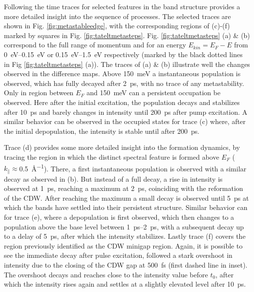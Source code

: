Following the time traces for selected features in the band structure provides a more detailed insight into the sequence of processes.
The selected traces are shown in Fig. \ref{fig:metastableedge}, with the corresponding regions of (c)-(f) marked by squares in Fig. \ref{fig:tateltmetasteps}.
Fig. \ref{fig:tateltmetasteps} (a) \& (b) correspond to the full range of momentum and for an energy $E_{kin}=E_F-E$ from \qtyrange{0}{0.15}{\electronvolt} or \qtyrange{0.15}{1.5}{\electronvolt} respectively (marked by the black dotted lines in Fig \ref{fig:tateltmetasteps} (a)).
The traces of (a) \& (b) illustrate well the changes observed in the difference maps.
Above \qty{150}{\milli\electronvolt} a instantaneous population is observed, which has fully decayed after \qty{2}{\pico\second}, with no trace of any metastability.
Only in region between $E_F$ and \qty{150}{\milli\electronvolt} can a persistent occupation be observed.
Here after the initial excitation, the population decays and stabilizes after \qty{10}{\pico\second} and barely changes in intensity until \qty{200}{\pico\second} after pump excitation.
A similar behavior can be observed in the occupied states for trace (c) where, after the initial depopulation, the intensity is stable until after \qty{200}{\pico\second}.

Trace (d) provides some more detailed insight into the formation dynamics, by tracing the region in which the distinct spectral feature is formed above $E_F$ ($k_\parallel\approx$\qty{0.5}{\angstrom^{-1}}).
There, a first instantaneous population is observed with a similar decay as observed in (b).
But instead of a full decay, a rise in intensity is observed at \qty{1}{\pico\second}, reaching a maximum at \qty{2}{\pico\second}, coinciding with the reformation of the CDW.
After reaching the maximum a small decay is observed until \qty{5}{\pico\second} at which the bands have settled into their persistent structure.
Similar behavior can for trace (e), where a depopulation is first observed, which then changes to a population above the base level between \qtyrange{1}{2}{\pico\second}, with a subsequent decay up to a delay of \qty{5}{\pico\second}, after which the intensity stabilizes.
Lastly trace (f) covers the region previously identified as the CDW minigap region.
Again, it is possible to see the immediate decay after pulse excitation, followed a stark overshoot in intensity due to the closing of the CDW gap at \qty{500}{\femto\second} (first dashed line in inset).
The overshoot decays and reaches close to the intensity value before $t_0$, after which the intensity rises again and settles at a slightly elevated level after \qty{10}{\pico\second}.



